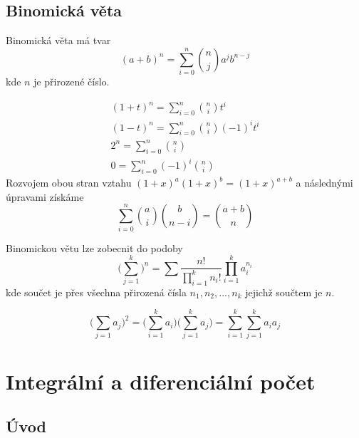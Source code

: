 \subsection{Binomická věta}

\begin{definition}
Binomická věta má tvar
\begin{equation*}
(a + b)^n = \sum_{i = 0}^n \binom{n}{j} a^j b^{n - j}
\end{equation*}
kde $n$ je přirozené číslo.
\end{definition}

\begin{theorem}
\begin{gather*}
(1 + t)^n = \sum_{i = 0}^n \binom{n}{i}t^i\\
(1 - t)^n = \sum_{i = 0}^n \binom{n}{i}(-1)^it^i\\
2^n = \sum_{i = 0}^n \binom{n}{i}\\
0 = \sum_{i = 0}^n (-1)^i \binom{n}{i}
\end{gather*}
Rozvojem obou stran vztahu $(1 + x)^a(1 + x)^b = (1 + x)^{a + b}$ a následnými úpravami získáme
\begin{equation*}
\sum_{i = 0}^n \binom{a}{i} \binom{b}{n - i} = \binom{a + b}{n}
\end{equation*}
\end{theorem}

\begin{theorem}
Binomickou větu lze zobecnit do podoby
\begin{equation*}
\Big(\sum_{j = 1}^k \Big)^n = \sum \frac{n!}{\prod_{i = 1}^k n_i!} \prod_{i = 1}^k a_i^{n_i}
\end{equation*}
kde součet je přes všechna přirozená čísla $n_1, n_2, ..., n_k$ jejichž součtem je $n$.
\end{theorem}

\begin{theorem}
\begin{equation*}
\Big(\sum_{j = 1} a_j \Big)^2 = \Big(\sum_{i = 1}^k a_i \Big)\Big(\sum_{j = 1}^k a_j \Big) = \sum_{i = 1}^k \sum_{j = 1}^k a_i a_j
\end{equation*}
\end{theorem}

\section{Integrální a diferenciální počet}

\subsection{Úvod}


